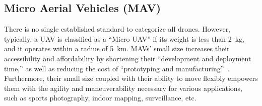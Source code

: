 \subsection{Micro Aerial Vehicles (MAV)}
\label{sec:mav}
There is no single established standard to categorize all drones. However, typically, a UAV is classified as a ``Micro UAV'' if its weight is less than 2~\si{\kilo\gram}, and it operates within a radius of 5~\si{\kilo\meter}. MAVs' small size increases their accessibility and affordability by shortening their ``development and deployment time,'' as well as reducing the cost of ``prototyping and manufacturing''~\cite{Zhang2017207}. Furthermore, their small size coupled with their ability to move flexibly empowers them with the agility and maneuverability necessary for various applications, such as sports photography, indoor mapping, surveillance, etc.

